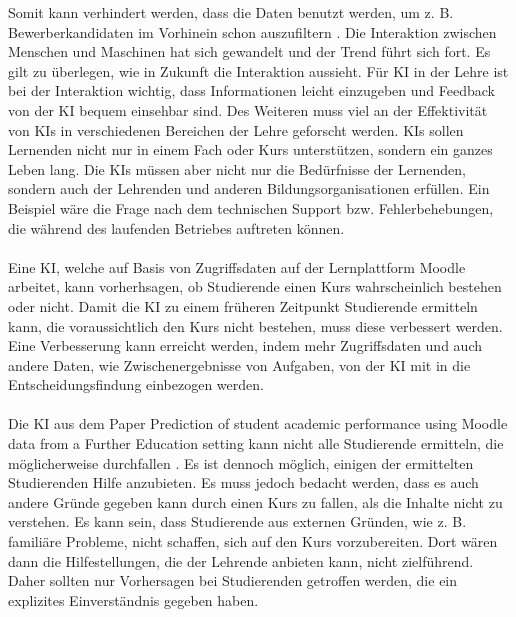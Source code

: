 Somit kann verhindert werden, dass die Daten benutzt werden, um z. B. Bewerberkandidaten im Vorhinein schon auszufiltern \cite[S. 8f]{Pinkwart.2016}.
Die Interaktion zwischen Menschen und Maschinen hat sich gewandelt und der Trend führt sich fort. Es gilt zu überlegen, wie in Zukunft die Interaktion aussieht.
Für KI in der Lehre ist bei der Interaktion wichtig, dass Informationen leicht einzugeben und Feedback von der KI bequem einsehbar sind.
Des Weiteren muss viel an der Effektivität von KIs in verschiedenen Bereichen der Lehre geforscht werden. KIs sollen Lernenden nicht nur in einem Fach oder Kurs unterstützen, sondern ein ganzes Leben lang.
Die KIs müssen aber nicht nur die Bedürfnisse der Lernenden, sondern auch der Lehrenden und anderen Bildungsorganisationen erfüllen.
Ein Beispiel wäre die Frage nach dem technischen Support bzw. Fehlerbehebungen, die während des laufenden Betriebes auftreten können.\cite[S. 10ff]{Pinkwart.2016}
\\
\\ \noindent
Eine KI, welche auf Basis von Zugriffsdaten auf der Lernplattform Moodle arbeitet, kann vorherhsagen, ob Studierende einen Kurs wahrscheinlich bestehen oder nicht.
Damit die KI zu einem früheren Zeitpunkt Studierende ermitteln kann, die voraussichtlich den Kurs nicht bestehen, muss diese verbessert werden.
Eine Verbesserung kann erreicht werden, indem mehr Zugriffsdaten und auch andere Daten, wie Zwischenergebnisse von Aufgaben, von der KI mit in die Entscheidungsfindung einbezogen werden. \cite[S. 14f]{Quinn.2020}
\\ \noindent
\\ \noindent
Die KI aus dem Paper \glqq Prediction of student academic performance using Moodle data from a Further Education setting\grqq{} kann nicht alle Studierende ermitteln, die möglicherweise durchfallen \cite[S. 16]{Quinn.2020}.
Es ist dennoch möglich, einigen der ermittelten Studierenden Hilfe anzubieten. Es muss jedoch bedacht werden, dass es auch andere Gründe gegeben kann durch einen Kurs zu fallen, als die Inhalte nicht zu verstehen.
Es kann sein, dass Studierende aus externen Gründen, wie z. B. familiäre Probleme, nicht schaffen, sich auf den Kurs vorzubereiten.
Dort wären dann die Hilfestellungen, die der Lehrende anbieten kann, nicht zielführend.
Daher sollten nur Vorhersagen bei Studierenden getroffen werden, die ein explizites Einverständnis gegeben haben.
